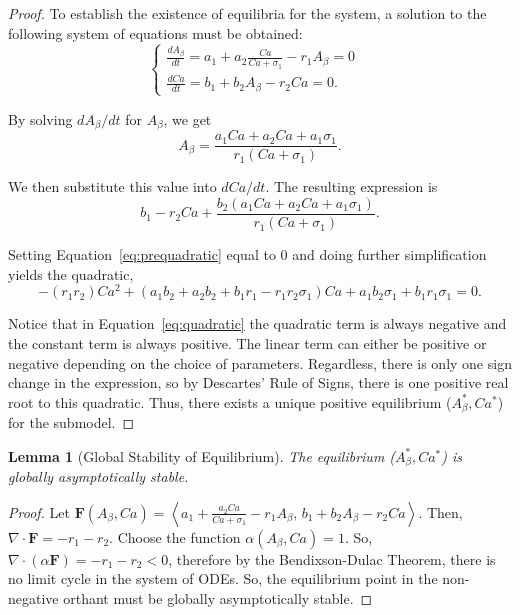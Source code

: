 \documentclass[12pt]{article}
\newtheorem{lem}{Lemma}
\theoremstyle{definition}
\begin{document}
\begin{proof}
    To establish the existence of equilibria for the system, a solution to the following system of equations must be obtained:
    \[\begin{cases}
        \frac{dA_\beta}{dt} = a_{1} + a_{2} \frac{Ca}{Ca+\sigma_1} - r_1 A_{\beta} = 0 & \\
        \frac{dCa}{dt} = b_{1} + b_{2} A_{\beta} - r_2 Ca = 0. & 
    \end{cases}\]

    By solving $dA_\beta/dt$ for $A_{\beta}$, we get
    \begin{equation*}
        A_{\beta} = \frac{a_1 Ca + a_2 Ca + a_1 \sigma_1}{r_1 (Ca + \sigma_1)}.
    \end{equation*}

    We then substitute this value into $dCa/dt$. The resulting expression is
    \begin{equation}\label{eq:prequadratic}
        b_1 - r_2 Ca + \frac{b_2 (a_1 Ca + a_2 Ca + a_1 \sigma_1)}{r_1 (Ca + \sigma_1)}.
    \end{equation}

    Setting Equation~\eqref{eq:prequadratic} equal to 0 and doing further simplification yields the quadratic,
    \begin{equation}\label{eq:quadratic}
        -(r_1 r_2)Ca^2 + (a_1 b_2 + a_2 b_2 + b_1 r_1 - r_1 r_2 \sigma_1)Ca + a_1 b_2 \sigma_1 + b_1 r_1 \sigma_1 = 0.
    \end{equation}

    Notice that in Equation~\eqref{eq:quadratic} the quadratic term is always negative and the constant term is always positive. The linear term can either be positive or negative depending on the choice of parameters. Regardless, there is only one sign change in the expression, so by Descartes' Rule of Signs, there is one positive real root to this quadratic. 
    Thus, there exists a unique positive equilibrium ($A _{\beta}^{*},Ca ^{*}$) for the submodel.
\end{proof} \bigskip

\begin{lem}[Global Stability of Equilibrium]\label{lem2}
    The equilibrium ($A _{\beta}^{*},Ca ^{*}$) is globally asymptotically stable.
\end{lem}

\begin{proof}
    Let $\mathbf{F} (A_{\beta}, Ca) = \left\langle a_1 + \frac{a_2 Ca}{Ca + \sigma_1} - r_1 A_{\beta}, \, b_1 + b_2 A_{\beta} - r_2 Ca \right\rangle$. Then, $\nabla \cdot \mathbf{F} = -r_1 - r_2$. Choose the function $\alpha (A_{\beta}, Ca) = 1$. So, $\nabla \cdot (\alpha \mathbf{F}) = -r_1 - r_2 < 0$, therefore by the Bendixson-Dulac Theorem, there is no limit cycle in the system of ODEs. So, the equilibrium point in the non-negative orthant must be globally asymptotically stable.
\end{proof} \bigskip 
\end{document}
